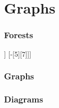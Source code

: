 \section{Graphs}
    \begin{frame}
        \frametitle{Forests}
        \centering
        \begin{forest}
		[\textbf{+}
			[*[3][2]]
			[-[5][7]]]
		\end{forest}
    \end{frame}

    \begin{frame}
        \frametitle{Graphs}
    \end{frame}
    
    \begin{frame}
        \frametitle{Diagrams}
    \end{frame}